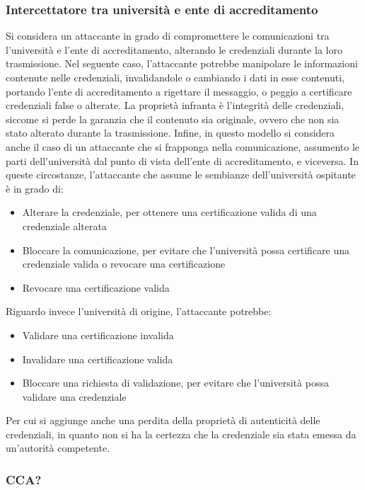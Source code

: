 \documentclass[a4paper,12pt]{article}
\begin{document}
\subsubsection{Intercettatore tra università e ente di accreditamento} Si considera un attaccante in grado di compromettere le comunicazioni tra l'università e l'ente di accreditamento, alterando le credenziali durante la loro trasmissione. Nel seguente caso, l'attaccante potrebbe manipolare le informazioni contenute nelle credenziali, invalidandole o cambiando i dati in esse contenuti, portando l'ente di accreditamento a rigettare il messaggio, o peggio a certificare credenziali false o alterate.
\newline La proprietà infranta è l'integrità delle credenziali, siccome si perde la garanzia che il contenuto sia originale, ovvero che non sia stato alterato durante la trasmissione.
\newline Infine, in questo modello si considera anche il caso di un attaccante che si frapponga nella comunicazione, assumento le parti dell'università dal punto di vista dell'ente di accreditamento, e viceversa. In queste circostanze, l'attaccante che assume le sembianze dell'università ospitante è in grado di:
\begin{itemize}
    \item Alterare la credenziale, per ottenere una certificazione valida di una credenziale alterata
    \item Bloccare la comunicazione, per evitare che l'università possa certificare una credenziale valida o revocare una certificazione
    \item Revocare una certificazione valida
\end{itemize}
Riguardo invece l'università di origine, l'attaccante potrebbe:
\begin{itemize}
    \item Validare una certificazione invalida
    \item Invalidare una certificazione valida
    \item Bloccare una richiesta di validazione, per evitare che l'università possa validare una credenziale
\end{itemize}
Per cui si aggiunge anche una perdita della proprietà di autenticità delle credenziali, in quanto non si ha la certezza che la credenziale sia stata emessa da un'autorità competente.

\subsubsection{CCA?}
\end{document}
